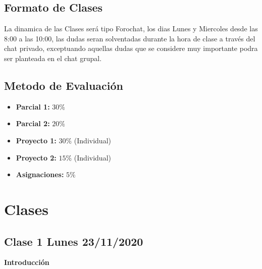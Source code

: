 \documentclass[11pt,letterpaper]{article}
\begin{document}
\subsection{Formato de Clases}
La dinamica de las Clases será tipo Forochat, los dias Lunes y Miercoles desde las 8:00 a las 10:00, las dudas seran solventadas durante la hora de clase a través del chat privado, exceptuando aquellas dudas que se considere muy importante podra ser planteada en el chat grupal.
\subsection{Metodo de Evaluación}

\begin{itemize}
	\item \textbf{Parcial 1:} $30\%$
	\item \textbf{Parcial 2:} $20\%$
	\item \textbf{Proyecto 1:} $30\%$ (Individual)
	\item \textbf{Proyecto 2:} $15\%$ (Individual)
	\item \textbf{Asignaciones:} $5\%$
\end{itemize}
\section{Clases}
\subsection{Clase 1 Lunes 23/11/2020}
\textbf{Introducción}
\end{document}
